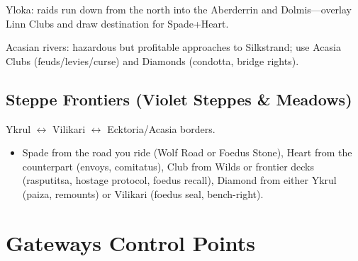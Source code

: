 Yloka: raids run down from the north into the Aberderrin and Dolmis---overlay Linn Clubs and draw destination for Spade+Heart.

Acasian rivers: hazardous but profitable approaches to Silkstrand; use Acasia Clubs (feuds/levies/curse) and Diamonds (condotta, bridge rights).

\subsection{Steppe Frontiers (Violet Steppes \& Meadows)}
Ykrul $\leftrightarrow$ Vilikari $\leftrightarrow$ Ecktoria/Acasia borders.

\begin{itemize}
\item Spade from the road you ride (Wolf Road or Foedus Stone), Heart from the counterpart (envoys, comitatus), Club from Wilds or frontier decks (rasputitsa, hostage protocol, foedus recall), Diamond from either Ykrul (paiza, remounts) or Vilikari (foedus seal, bench-right).
\end{itemize}

\section{Gateways Control Points}

